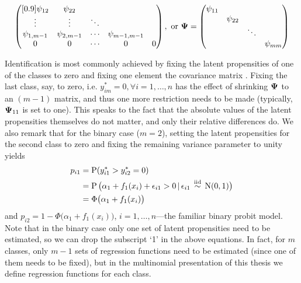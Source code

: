 \begin{itemize}
\[\begin{pmatrix}[0.9]
    \psi_{12} &\psi_{22}  \\  
    \vdots    &\vdots    &\ddots \\
    \psi_{1,m-1}         &\psi_{2,m-1} &\cdots &\psi_{m-1,m-1} \\
    0         &0         &\cdots &0 &0
    \end{pmatrix},
    \text{ or }
    {\bm\Psi} = 
    \begin{pmatrix}
    \psi_{11} & \\
    &\psi_{22}  \\  
    &&\ddots \\
    &&&\psi_{mm} \\
    \end{pmatrix}
  \]
\end{itemize}

\begin{remark}
  Identification is most commonly achieved by fixing the latent propensities of one of the classes to zero and fixing one element the covariance matrix \citep{dansie1985parameter,bunch1991estimability}.
  Fixing the last class, say, to zero, i.e. $y_{im}^* = 0,\forall i=1,\dots,n$ has the effect of shrinking ${\bm\Psi}$ to an $(m-1)$ matrix, and thus one more restriction needs to be made (typically, ${\bm\Psi}_{11}$ is set to one).
  This speaks to the fact that the absolute values of the latent propensities themselves do not matter, and only their relative differences do.   
  We also remark that for the binary case ($m=2$), setting the latent propensities for the second class to zero and fixing the remaining variance parameter to unity yields
  \begin{align}
    p_{i1} 
    &= \operatorname{P}(y_{i1}^* > y_{i2}^* = 0) \nonumber \\
    &= \operatorname{P}\big(\alpha_1 + f_1(x_i) + \epsilon_{i1} > 0 \,|\, \epsilon_{i1} \,\overset{\text{iid}}{\sim}\, \operatorname{N}(0,1) \big) \nonumber \\
    &= \Phi\big( \alpha_1 + f_1(x_i) \big) \label{eq:iprobitbin} 
  \end{align}
  and $p_{i2} = 1 - \Phi\big( \alpha_1 + f_1(x_i) \big)$,  $i=1,\dots,n$---the familiar binary probit model.
  Note that in the binary case only one set of latent propensities need to be estimated, so we can drop the subscript `1' in the above equations.
  In fact, for $m$ classes, only $m-1$ sets of regression functions need to be estimated (since one of them needs to be fixed), but in the multinomial presentation of this thesis we define regression functions for each class.
\end{remark}

